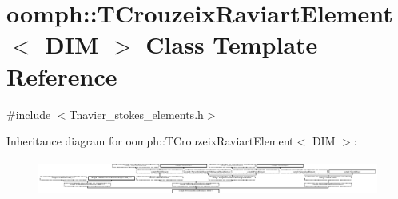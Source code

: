 \hypertarget{classoomph_1_1TCrouzeixRaviartElement}{}\section{oomph\+:\+:T\+Crouzeix\+Raviart\+Element$<$ D\+IM $>$ Class Template Reference}
\label{classoomph_1_1TCrouzeixRaviartElement}


{\ttfamily \#include $<$Tnavier\+\_\+stokes\+\_\+elements.\+h$>$}

Inheritance diagram for oomph\+:\+:T\+Crouzeix\+Raviart\+Element$<$ D\+IM $>$\+:\begin{figure}[H]
\begin{center}
\leavevmode
\includegraphics[height=1.194030cm]{classoomph_1_1TCrouzeixRaviartElement}
\end{center}
\end{figure}
